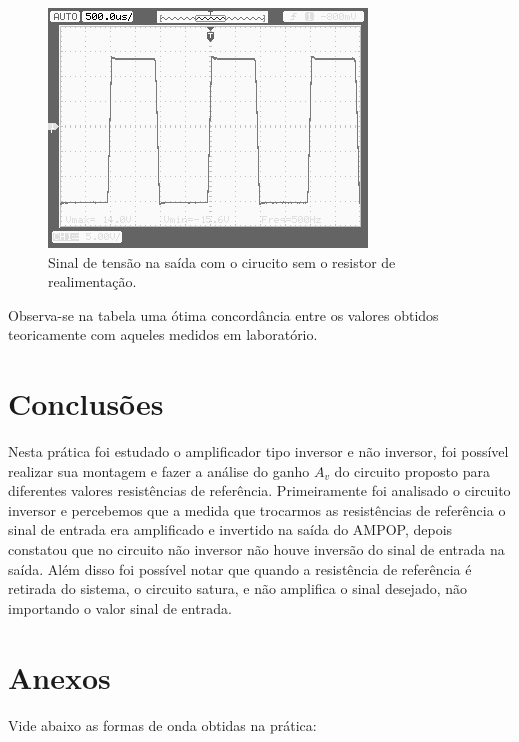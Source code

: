 \begin{figure}[H] 
\includegraphics[scale=0.7]{imagens/saturado.jpg} 
\centering
\caption{Sinal de tensão na saída com o cirucito sem o resistor de realimentação.}
\label{fig:saturado} 
\end{figure} 

Observa-se na tabela uma ótima concordância entre os valores obtidos teoricamente com aqueles medidos em laboratório.

\section{Conclusões}

Nesta prática foi estudado o amplificador tipo inversor e não inversor, foi possível realizar sua montagem e fazer a análise do ganho $A_v$ do circuito proposto para diferentes valores resistências de referência. Primeiramente foi analisado o circuito inversor e percebemos que a medida que trocarmos as resistências de referência o sinal de entrada era amplificado e invertido na saída do AMPOP, depois constatou que no circuito não inversor não houve inversão do sinal de entrada na saída. Além disso foi possível notar que quando a resistência de referência é retirada do sistema, o circuito satura, e não amplifica o sinal desejado, não importando o valor sinal de entrada.

\newpage

\section{Anexos}
Vide abaixo as formas de onda obtidas na prática:

